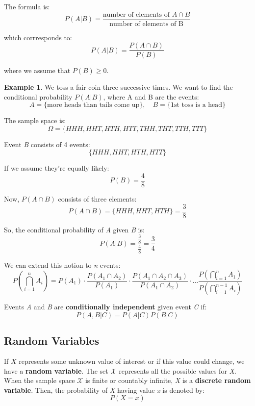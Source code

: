 \documentclass[12pt]{book}
\theoremstyle{definition}
\newtheorem{exmp}{Example}[section]
\begin{document}
The formula is:
\begin{equation}
    P(A|B) = \frac{\text{number of elements of $A \cap B$}}{\text{number of elements of B}}
\end{equation}

which corrresponds to:
\begin{equation}
    P(A|B) = \frac{P(A \cap B)}{P(B)}
\end{equation}

where we assume that $P(B) \geq 0$.

\begin{exmp}
    We toss a fair coin three successive times. We want to find the conditional probability $P(A|B)$, where A and B are the events:
    \[
        A = \{\text{more heads than tails come up}\}, \quad B = \{\text{1st toss is a head}\}
    \]

    The sample space is:
    \[
        \Omega = \{HHH, HHT, HTH, HTT, THH, THT, TTH, TTT\}
    \]

    Event \textit{B} consists of 4 events: 
    \[
        \{HHH, HHT, HTH, HTT\}
    \]

    If we assume they're equally likely:
    \[
        P(B) = \frac{4}{8}
    \]

    Now, $P(A \cap B)$ consists of three elements:
    \[
        P(A \cap B) = \{HHH, HHT, HTH\} = \frac{3}{8}
    \]

    So, the conditional probability of \textit{A} given \textit{B} is:
    \[
        P(A|B) = \frac{\frac{3}{8}}{\frac{4}{8}} = \frac{3}{4}
    \]
\end{exmp}

We can extend this notion to \textit{n} events:
\begin{equation}
    P(\bigcap_{i = 1}^{n} A_i) = P(A_1) \cdot \frac{P(A_1 \cap A_2)}{P(A_1)} \cdot \frac{P(A_1 \cap A_2 \cap A_3)}{P(A_1 \cap A_2)} \cdot \dots \frac{P(\bigcap_{i = 1}^{n} A_1)}{P(\bigcap_{i = 1}^{n-1}A_i)}
\end{equation}

Events \textit{A} and \textit{B} are \textbf{conditionally independent} given event \textit{C} if:
\[
    P(A,B | C) = P(A|C)P(B|C)
\]

\subsection{Random Variables}
If $X$ represents some unknown value of interest or if this value could change, we have a \textbf{random variable}. The set $\mathcal{X}$ represents all the possible values for \textit{X}. When the sample space $\mathcal{X}$ is finite or countably infinite, \textit{X} is a \textbf{discrete random variable}. Then, the probability of \textit{X} having value \textit{x} is denoted by:
\[
    P(X = x)
\]
\end{document}
